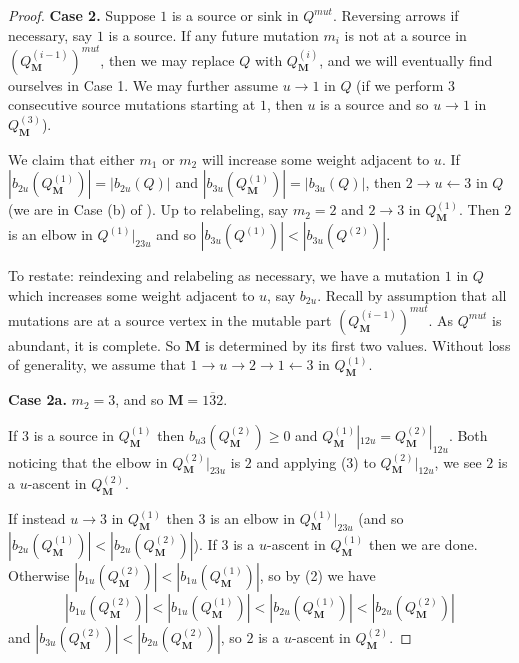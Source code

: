 \documentclass[12pt]{amsart}
\theoremstyle{definition}
\theoremstyle{remark}
\numberwithin{equation}{section}
\begin{document}
\begin{proof}
\textbf{Case 2.} Suppose $1$ is a source or sink in $Q^{mut}$. Reversing arrows if necessary, say $1$ is a source.
If any future mutation $m_i$ is not at a source in $(Q^{(i-1)}_{\mathbf{M}})^{mut}$, then we may replace $Q$ with $Q^{(i)}_{\mathbf{M}}$, and we will eventually find ourselves in Case 1.
We may further assume $u \rightarrow 1$ in $Q$ (if we perform $3$ consecutive source mutations starting at $1$, then $u$ is a source and so $u \rightarrow 1$ in $Q^{(3)}_{\mathbf{M}}$). 

We claim that either $m_1$ or $m_2$ will increase some weight adjacent to $u$. 
If $|b_{2u}(Q^{(1)}_{\mathbf M})| = |b_{2u}(Q)|$ and $|b_{3u}(Q^{(1)}_{\mathbf M})|=|b_{3u}(Q)|$, then $2 \rightarrow u \leftarrow 3$ in $Q$ (we are in Case (b) of ).
Up to relabeling, say $m_2=2$ and $2 \rightarrow 3$ in $Q^{(1)}_{\mathbf M}$. 
Then $2$ is an elbow in $Q^{(1)}|_{23u}$ and so $|b_{3u}(Q^{(1)})| < |b_{3u}(Q^{(2)})|$. 

To restate: reindexing and relabeling as necessary, we have a mutation $1$ in $Q$ which increases some weight adjacent to $u$, say $b_{2u}$. 
Recall by assumption that all mutations are at a source vertex in the mutable part $(Q^{(i-1)}_{\mathbf{M}})^{mut}$. 
As $Q^{mut}$ is abundant, it is complete. So $\mathbf{M}$ is determined by its first two values.
Without loss of generality, we assume that $1 \rightarrow u \rightarrow 2 \rightarrow 1 \leftarrow 3$ in $Q^{(1)}_{\mathbf{M}}$.

\textbf{Case 2a.} $m_2=3$, and so $\mathbf M = \overline{132}$.

If $3$ is a source in $Q^{(1)}_{\mathbf M}$ then $b_{u3}(Q^{(2)}_{\mathbf M}) \geq 0$ and $Q^{(1)}_{\mathbf M}|_{12u} = Q^{(2)}_{\mathbf M}|_{12u}$.
Both noticing that the elbow in $Q^{(2)}_{\mathbf M}|_{23u}$ is $2$ and applying  (3) to $Q^{(2)}_{\mathbf M}|_{12u}$, we see $2$ is a $u$-ascent in $Q^{(2)}_{\mathbf M}$.

If instead $u \rightarrow 3$ in $Q^{(1)}_{\mathbf M}$ then $3$ is an elbow in $Q^{(1)}_{\mathbf M}|_{23u}$ (and so $|b_{2u}(Q^{(1)}_{\mathbf M})| < |b_{2u}(Q^{(2)}_{\mathbf M})| $). 
If $3$ is a $u$-ascent in $Q^{(1)}_{\mathbf M}$ then we are done. 
Otherwise $|b_{1u}(Q^{(2)}_{\mathbf M})| < |b_{1u}(Q^{(1)}_{\mathbf M})|$, so by  (2) we have 
\[|b_{1u}(Q^{(2)}_{\mathbf M})| < |b_{1u}(Q^{(1)}_{\mathbf M})| < |b_{2u}(Q^{(1)}_{\mathbf M})| < |b_{2u}(Q^{(2)}_{\mathbf M})| \] 
and $|b_{3u}(Q^{(2)}_{\mathbf M})| < |b_{2u}(Q^{(2)}_{\mathbf M})|$, so $2$ is a $u$-ascent in $Q^{(2)}_{\mathbf M}$.


\end{proof}
\end{document}
